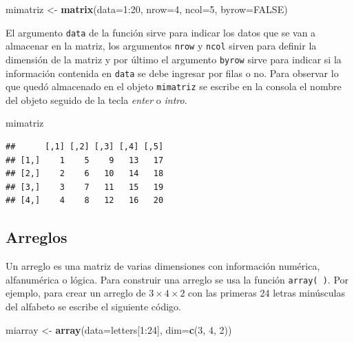 \documentclass[10pt,]{krantz}
\makeatletter
\newenvironment{Shaded}{\begin{snugshade}}{\end{snugshade}}
\newcommand{\KeywordTok}[1]{\textcolor[rgb]{0.13,0.29,0.53}{\textbf{{#1}}}}
\newcommand{\DataTypeTok}[1]{\textcolor[rgb]{0.13,0.29,0.53}{{#1}}}
\newcommand{\DecValTok}[1]{\textcolor[rgb]{0.00,0.00,0.81}{{#1}}}
\newcommand{\StringTok}[1]{\textcolor[rgb]{0.31,0.60,0.02}{{#1}}}
\newcommand{\OtherTok}[1]{\textcolor[rgb]{0.56,0.35,0.01}{{#1}}}
\newcommand{\NormalTok}[1]{{#1}}
\newenvironment{kframe}{%
\medskip{}
\setlength{\fboxsep}{.8em}
 \def\at@end@of@kframe{}%
 \ifinner\ifhmode%
  \def\at@end@of@kframe{\end{minipage}}%
  \begin{minipage}{\columnwidth}%
 \fi\fi%
 \def\FrameCommand##1{\hskip\@totalleftmargin \hskip-\fboxsep
 \colorbox{shadecolor}{##1}\hskip-\fboxsep
     \hskip-\linewidth \hskip-\@totalleftmargin \hskip\columnwidth}%
 \MakeFramed {\advance\hsize-\width
   \@totalleftmargin\z@ \linewidth\hsize
   \@setminipage}}%
 {\par\unskip\endMakeFramed%
 \at@end@of@kframe}
\renewenvironment{Shaded}{\begin{kframe}}{\end{kframe}}
\makeatother
\begin{document}
\begin{Shaded}
\begin{Highlighting}[]
\NormalTok{mimatriz <-}\StringTok{ }\KeywordTok{matrix}\NormalTok{(}\DataTypeTok{data=}\DecValTok{1}\NormalTok{:}\DecValTok{20}\NormalTok{, }\DataTypeTok{nrow=}\DecValTok{4}\NormalTok{, }\DataTypeTok{ncol=}\DecValTok{5}\NormalTok{, }\DataTypeTok{byrow=}\OtherTok{FALSE}\NormalTok{)}
\end{Highlighting}
\end{Shaded}

El argumento \texttt{data} de la función sirve para indicar los datos
que se van a almacenar en la matriz, los argumentos \texttt{nrow} y
\texttt{ncol} sirven para definir la dimensión de la matriz y por último
el argumento \texttt{byrow} sirve para indicar si la información
contenida en \texttt{data} se debe ingresar por filas o no. Para
observar lo que quedó almacenado en el objeto \texttt{mimatriz} se
escribe en la consola el nombre del objeto seguido de la tecla
\textit{enter} o \textit{intro}.

\begin{Shaded}
\begin{Highlighting}[]
\NormalTok{mimatriz}
\end{Highlighting}
\end{Shaded}

\begin{verbatim}
##      [,1] [,2] [,3] [,4] [,5]
## [1,]    1    5    9   13   17
## [2,]    2    6   10   14   18
## [3,]    3    7   11   15   19
## [4,]    4    8   12   16   20
\end{verbatim}

\subsection{Arreglos}

Un arreglo  es una matriz de varias dimensiones con
información numérica, alfanumérica o lógica. Para construir una arreglo
se usa la función \texttt{array(\ )}. Por ejemplo, para crear un arreglo
de \(3 \times 4 \times 2\) con las primeras 24 letras minúsculas del
alfabeto se escribe el siguiente código.

\begin{Shaded}
\begin{Highlighting}[]
\NormalTok{miarray <-}\StringTok{ }\KeywordTok{array}\NormalTok{(}\DataTypeTok{data=}\NormalTok{letters[}\DecValTok{1}\NormalTok{:}\DecValTok{24}\NormalTok{], }\DataTypeTok{dim=}\KeywordTok{c}\NormalTok{(}\DecValTok{3}\NormalTok{, }\DecValTok{4}\NormalTok{, }\DecValTok{2}\NormalTok{))}
\end{Highlighting}
\end{Shaded}
\end{document}
